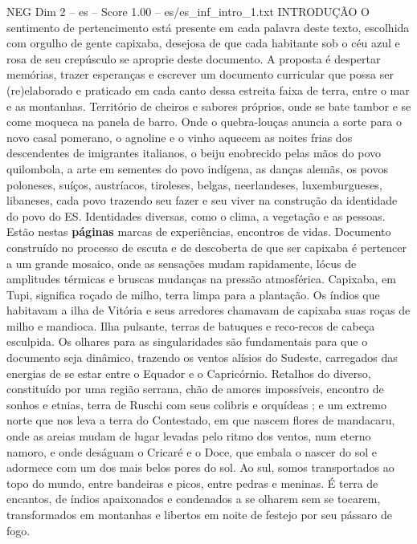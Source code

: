\begin{textsample}{NEG Dim 2 – es – Score 1.00 – es/es\_inf\_intro\_1.txt}  \label{ex:f2_neg_079}
INTRODUÇÃO O sentimento de pertencimento está presente em cada palavra deste texto, escolhida com orgulho de gente capixaba, desejosa de que cada habitante sob o céu azul e rosa de seu crepúsculo se aproprie deste documento.
A proposta é despertar memórias, trazer esperanças e escrever um documento curricular que possa ser (re)elaborado e praticado em cada canto dessa estreita faixa de terra, entre o mar e as montanhas.
Território de cheiros e sabores próprios, onde se bate tambor e se come moqueca na panela de barro.
Onde o quebra-louças anuncia a sorte para o novo casal pomerano, o agnoline e o vinho aquecem as noites frias dos descendentes de imigrantes italianos, o beiju enobrecido pelas mãos do povo quilombola, a arte em sementes do povo indígena, as danças alemãs, os povos poloneses, suíços, austríacos, tiroleses, belgas, neerlandeses, luxemburgueses, libaneses, cada povo trazendo seu fazer e seu viver na construção da identidade do povo do ES.
Identidades diversas, como o clima, a vegetação e as pessoas.
Estão nestas \textbf{páginas} marcas de experiências, encontros de vidas.
Documento construído no processo de escuta e de descoberta de que ser capixaba é pertencer a um grande mosaico, onde as sensações mudam rapidamente, lócus de amplitudes térmicas e bruscas mudanças na pressão atmosférica.
Capixaba, em Tupi, significa roçado de milho, terra limpa para a plantação.
Os índios que habitavam a ilha de Vitória e seus arredores chamavam de capixaba suas roças de milho e mandioca.
Ilha pulsante, terras de batuques e reco-recos de cabeça esculpida.
Os olhares para as singularidades são fundamentais para que o documento seja dinâmico, trazendo os ventos alísios do Sudeste, carregados das energias de se estar entre o Equador e o Capricórnio.
Retalhos do diverso, constituído por uma região serrana, chão de amores impossíveis, encontro de sonhos e etnias, terra de Ruschi com seus colibris e orquídeas ; e um extremo norte que nos leva a terra do Contestado, em que nascem flores de mandacaru, onde as areias mudam de lugar levadas pelo ritmo dos ventos, num eterno namoro, e onde deságuam o Cricaré e o Doce, que embala o nascer do sol e adormece com um dos mais belos pores do sol.
Ao sul, somos transportados ao topo do mundo, entre bandeiras e picos, entre pedras e meninas.
É terra de encantos, de índios apaixonados e condenados a se olharem sem se tocarem, transformados em montanhas e libertos em noite de festejo por seu pássaro de fogo.

\end{textsample}
